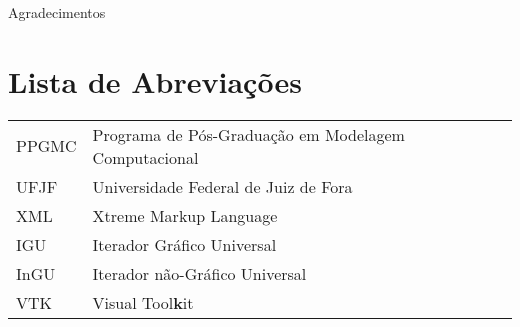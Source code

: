 \documentclass[a4paper,12pt]{monografia}
\theoremstyle{plain}
\theoremstyle{definition}
\theoremstyle{remark}
\begin{document}



 \indent\indent 
Agradecimentos
\newpage










\chapter*{Lista de Abrevia\c{c}\~oes} 
\doublespacing  \begin{tabular}{l l}

PPGMC & Programa de Pós-Graduação em Modelagem Computacional \\
UFJF & Universidade Federal de Juiz de Fora  \\
XML & Xtreme Markup Language\\
IGU & Iterador Gráfico Universal\\
InGU & Iterador não-Gráfico Universal\\
VTK & Visual Tool\textbf{k}it



\end{tabular}  \thispagestyle{empty}




%
%
%
\pagestyle{ruledheader}
 

\end{document}
